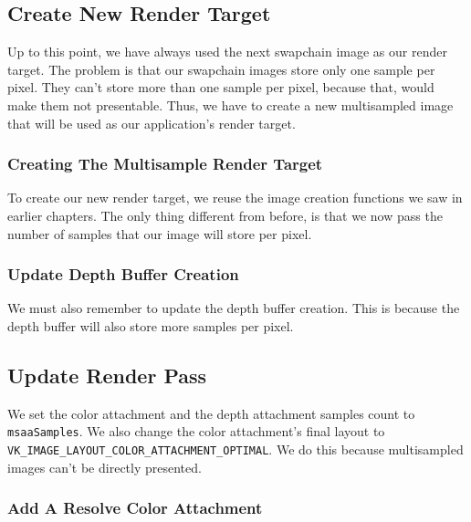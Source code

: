 \subsection{Create New Render Target}

Up to this point, we have always used the next swapchain image as our
render target.
The problem is that our swapchain images store only one sample per pixel.
They can't store more than one sample per pixel, because that, would make
them not presentable.
Thus, we have to create a new multisampled image that will be used
as our application's render target.

\subsubsection{Creating The Multisample Render Target}

To create our new render target, we reuse the image creation functions
we saw in earlier chapters.
The only thing different from before, is that we now pass the
number of samples that our image will store per pixel.

\begin{minipage}{\linewidth}{\noindent}
    
\end{minipage}

\subsubsection{Update Depth Buffer Creation}

We must also remember to update the depth buffer creation.
This is because the depth buffer will also store more samples per pixel.

\subsection{Update Render Pass}

We set the color attachment and the depth attachment samples count
to \texttt{msaaSamples}.
We also change the color attachment's final layout to
\texttt{VK\_IMAGE\_LAYOUT\_COLOR\_ATTACHMENT\_OPTIMAL}.
We do this because multisampled images can't be directly presented.

\subsubsection{Add A Resolve Color Attachment}

